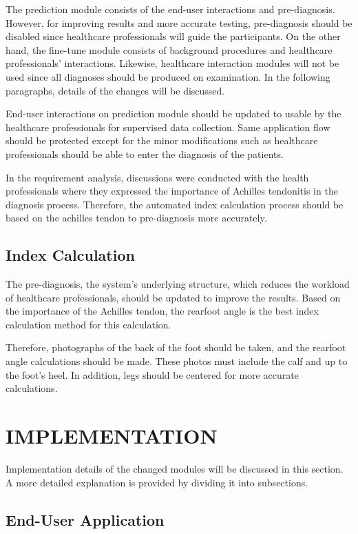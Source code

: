 The prediction module consists of the end-user interactions and pre-diagnosis. However, for improving results and more accurate testing, pre-diagnosis should be disabled since healthcare professionals will guide the participants. On the other hand, the fine-tune module consists of background procedures and healthcare professionals' interactions. Likewise, healthcare interaction modules will not be used since all diagnoses should be produced on examination. In the following paragraphs, details of the changes will be discussed.

End-user interactions on prediction module should be updated to usable by the healthcare professionals for supervised data collection. Same application flow should be protected except for the minor modifications such as healthcare professionals should be able to enter the diagnosis of the patients.

In the requirement analysis, discussions were conducted with the health professionals where they expressed the importance of Achilles tendonitis in the diagnosis process. Therefore, the automated index calculation process should be based on the achilles tendon to pre-diagnosis more accurately.

\subsection{ Index Calculation }

The pre-diagnosis, the system's underlying structure, which reduces the workload of healthcare professionals, should be updated to improve the results. Based on the importance of the Achilles tendon, the rearfoot angle is the best index calculation method for this calculation. 

Therefore, photographs of the back of the foot should be taken, and the rearfoot angle calculations should be made. These photos must include the calf and up to the foot's heel. In addition, legs should be centered for more accurate calculations.

\section{IMPLEMENTATION}\label{sec:StudyIIImplementation}

Implementation details of the changed modules will be discussed in this section. A more detailed explanation is provided by dividing it into subsections. 

\subsection{End-User Application}

